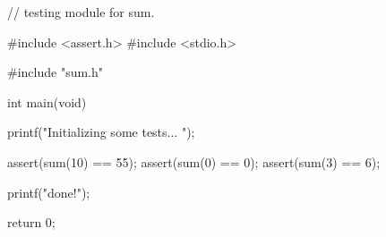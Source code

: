 \begin{code}[C]
// testing module for sum.

#include <assert.h>
#include <stdio.h>

#include "sum.h"

int main(void)
{
	printf("Initializing some tests... \n");
	
	assert(sum(10) == 55);
	assert(sum(0) == 0);
	assert(sum(3) == 6);
	
	printf("done!\n");
	
	
	return 0;
}
\end{code}







 